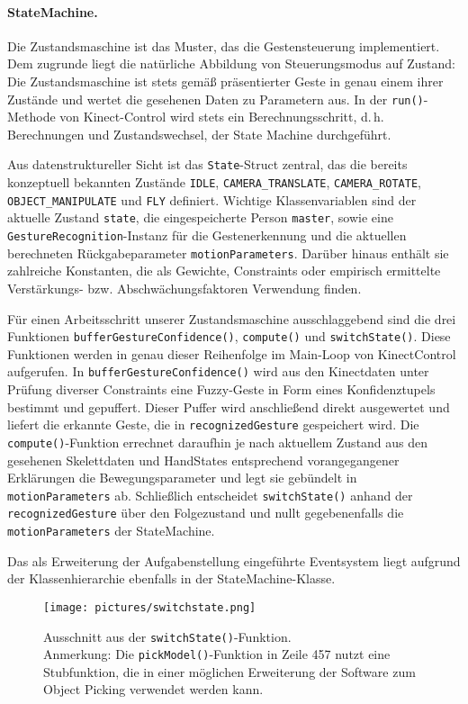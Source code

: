 	\paragraph{StateMachine.}
	Die Zustandsmaschine ist das Muster, das die Gestensteuerung implementiert. Dem zugrunde liegt die natürliche Abbildung von Steuerungsmodus auf Zustand: Die Zustandsmaschine ist stets gemäß präsentierter Geste in genau einem ihrer Zustände und wertet die gesehenen Daten zu Parametern aus. In der \texttt{run()}-Methode von Kinect-Control wird stets ein Berechnungsschritt, d.\,h. Berechnungen und Zustandswechsel, der State Machine durchgeführt.\par 
	Aus datenstruktureller Sicht ist das \texttt{State}-Struct zentral, das die bereits konzeptuell bekannten Zustände \texttt{IDLE}, \texttt{CAMERA\_TRANSLATE}, \texttt{CAMERA\_ROTATE}, \texttt{OBJECT\_MANIPULATE} und \texttt{FLY} definiert. Wichtige Klassenvariablen sind der aktuelle Zustand \glqq{}\texttt{state}\grqq{}, die eingespeicherte Person \glqq{}\texttt{master}\grqq{}, sowie eine \texttt{GestureRecognition}-Instanz für die Gestenerkennung und die aktuellen berechneten Rückgabeparameter \glqq{}\texttt{motionParameters}\grqq{}. Darüber hinaus enthält sie zahlreiche Konstanten, die als Gewichte, Constraints oder empirisch ermittelte Verstärkungs- bzw. Abschwächungsfaktoren Verwendung finden.\par 
	Für einen Arbeitsschritt unserer Zustandsmaschine ausschlaggebend sind die drei Funktionen \texttt{bufferGestureConfidence()}, \texttt{compute()} und \texttt{switchState()}. Diese Funktionen werden in genau dieser Reihenfolge im Main-Loop von KinectControl aufgerufen. In \texttt{bufferGestureConfidence()} wird aus den Kinectdaten unter Prüfung diverser Constraints eine Fuzzy-Geste in Form eines Konfidenztupels bestimmt und gepuffert. Dieser Puffer wird anschließend direkt ausgewertet und liefert die erkannte Geste, die in \texttt{recognizedGesture} gespeichert wird. Die \texttt{compute()}-Funktion errechnet daraufhin je nach aktuellem Zustand aus den gesehenen Skelettdaten und HandStates entsprechend vorangegangener Erklärungen die Bewegungsparameter und legt sie gebündelt in \texttt{motionParameters} ab. Schließlich entscheidet \texttt{switchState()} anhand der \texttt{recognizedGesture} über den Folgezustand und nullt gegebenenfalls die \texttt{motionParameters} der StateMachine.\par 
	Das als Erweiterung der Aufgabenstellung eingeführte Eventsystem liegt aufgrund der Klassenhierarchie ebenfalls in der StateMachine-Klasse.
	\begin{figure}[!h]
	\centering
	\texttt{[image: pictures/switchstate.png]}
	\caption{Ausschnitt aus der \texttt{switchState()}-Funktion.\\Anmerkung: Die \texttt{pickModel()}-Funktion in Zeile 457 nutzt eine Stubfunktion, die in einer möglichen Erweiterung der Software zum Object Picking verwendet werden kann.}\label{fig:switchstate}
	\end{figure}